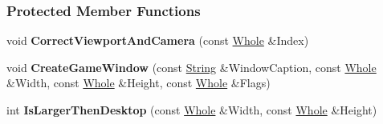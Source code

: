 \subsubsection*{Protected Member Functions}
\begin{DoxyCompactItemize}
\item 
\hypertarget{classMezzanine_1_1GameWindow_a3455efef5fb6a145649ecf4eb088f318}{
void {\bfseries CorrectViewportAndCamera} (const \hyperlink{namespaceMezzanine_adcbb6ce6d1eb4379d109e51171e2e493}{Whole} \&Index)}
\label{classMezzanine_1_1GameWindow_a3455efef5fb6a145649ecf4eb088f318}

\item 
\hypertarget{classMezzanine_1_1GameWindow_acc55f88a63f67c381ea51a8918061aa5}{
void {\bfseries CreateGameWindow} (const \hyperlink{namespaceMezzanine_acf9fcc130e6ebf08e3d8491aebcf1c86}{String} \&WindowCaption, const \hyperlink{namespaceMezzanine_adcbb6ce6d1eb4379d109e51171e2e493}{Whole} \&Width, const \hyperlink{namespaceMezzanine_adcbb6ce6d1eb4379d109e51171e2e493}{Whole} \&Height, const \hyperlink{namespaceMezzanine_adcbb6ce6d1eb4379d109e51171e2e493}{Whole} \&Flags)}
\label{classMezzanine_1_1GameWindow_acc55f88a63f67c381ea51a8918061aa5}

\item 
\hypertarget{classMezzanine_1_1GameWindow_ad2c84a47e063186c5f47213153cc3e85}{
int {\bfseries IsLargerThenDesktop} (const \hyperlink{namespaceMezzanine_adcbb6ce6d1eb4379d109e51171e2e493}{Whole} \&Width, const \hyperlink{namespaceMezzanine_adcbb6ce6d1eb4379d109e51171e2e493}{Whole} \&Height)}
\label{classMezzanine_1_1GameWindow_ad2c84a47e063186c5f47213153cc3e85}

\end{DoxyCompactItemize}
